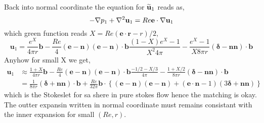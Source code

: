 Back into normal coordinate the equation for $\widetilde{\textbf{u}}_1$ reads as,
\begin{equation}
    - {\mathbf{\nabla}} {p}_1 +  {\mathbf{\nabla}}^2 {\textbf{u}}_1
    =
     Re \textbf{e} \cdot {\mathbf{\nabla}} {\textbf{u}}_1
\end{equation}
which green function reads $X = Re (\textbf{e}\cdot \textbf{r} - r)/2$,
\begin{equation}
    \textbf{u}_1 =
    \frac{e^X}{4\pi r} \textbf{b}
    -
    \frac{Re}{4}(\textbf{e} - \textbf{n})
    (\textbf{e} - \textbf{n})\cdot \textbf{b}
    \frac{(1-X) e^X - 1}{X^2 4 \pi}
    - \frac{e^X- 1}{X 8 \pi r}  (\bm\delta  - \textbf{nn} )\cdot \textbf{b}
\end{equation}
Anyhow for small X we get,
\begin{align}
    \textbf{u}_1 &\approx
    \frac{1+X}{4\pi r} \textbf{b}
    -
    \frac{Re}{4}(\textbf{e} - \textbf{n})
    (\textbf{e} - \textbf{n})\cdot \textbf{b}
    \frac{-1/2-X/3}{ 4 \pi}
    - \frac{1+X/2}{8 \pi r}  (\bm\delta  - \textbf{nn} )\cdot \textbf{b}\\
    &=\frac{1}{8 \pi r}  (\bm\delta  + \textbf{nn} )\cdot \textbf{b} +
     \frac{Re}{32\pi }\textbf{b}\cdot \left\{
         (\textbf{e} - \textbf{n})
        (\textbf{e} - \textbf{n})
        +(\textbf{e}\cdot \textbf{n} - 1)  (3\bm\delta  + \textbf{nn} )
    \right\}
\end{align}
which
 is the Stokeslet for sa shere in pure stokes flow hence the matching is okay.
The outter expansin written in normal coordinate must remains consistant with the inner expansion for small $(Re,r)$.

